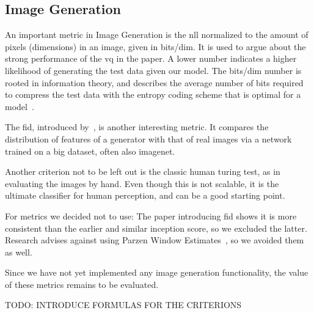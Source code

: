 \subsection{Image Generation}\label{subsec:image-generation}
An important metric in Image Generation is the \ac{nll} normalized to the amount of pixels (dimensions) in an image, given in bits/dim.
It is used to argue about the strong performance of the \ac{vq} in the paper.
A lower number indicates a higher likelihood of generating the test data given our model.
The bits/dim number is rooted in information theory, and describes the average number of bits required to
compress the test data with the entropy coding scheme that is optimal for a model~\cite{shannon}.

The \ac{fid}, introduced by~\cite{fid}, is another interesting metric.
It compares the distribution of features of a generator with that of real images via a network trained on a big
dataset, often also imagenet.

Another criterion not to be left out is the classic human turing test, as in evaluating the images by hand.
Even though this is not scalable, it is the ultimate classifier for human perception, and can be a good starting
point.

For metrics we decided not to use: The paper introducing \ac{fid} shows it is more consistent than the earlier and
similar inception score, so we excluded the latter.
Research advises against using Parzen Window Estimates~\cite{note_on_eval}, so we avoided them as well.

Since we have not yet implemented any image generation functionality, the value of these metrics remains to be evaluated.

TODO: INTRODUCE FORMULAS FOR THE CRITERIONS
